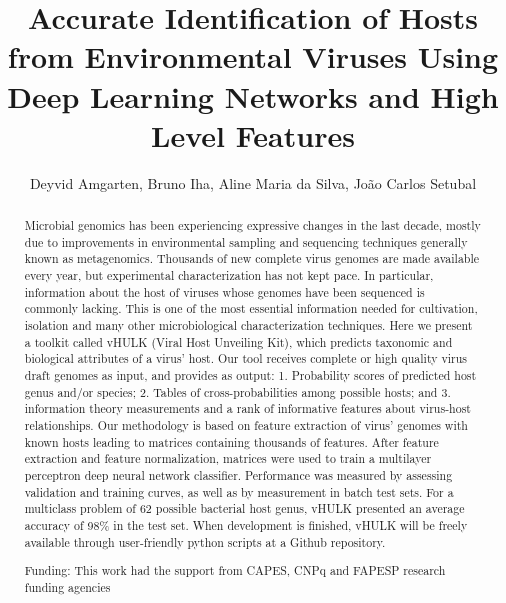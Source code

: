 \documentclass[twoside]{article}
\title{\vspace{-15mm}\fontsize{24pt}{10pt}\selectfont\textbf{ Accurate Identification of Hosts from Environmental Viruses Using Deep Learning Networks and High Level Features }} %
\author{ Deyvid Amgarten, Bruno Iha, Aline Maria da Silva, Jo\~ao Carlos Setubal }
\affil{ Laborat\'orio de T\'ecnicas Especiais,  Hospital Israelita Albert Einstein }
\date{}
\begin{document}
  
  
  \maketitle %
  
  
  \thispagestyle{fancy} %
  
  
  \begin{abstract}
  Microbial genomics has been experiencing expressive changes in the last decade,  mostly due to improvements in environmental sampling and sequencing techniques generally known as metagenomics. Thousands of new complete virus genomes are made available every year,  but experimental characterization has not kept pace. In particular,  information about the host of viruses whose genomes have been sequenced is commonly lacking. This is one of the most essential information needed for cultivation,  isolation and many other microbiological characterization techniques. Here we present a toolkit called vHULK (Viral Host Unveiling Kit),  which predicts taxonomic and biological attributes of a virus’ host. Our tool receives complete or high quality virus draft genomes as input,  and provides as output: 1. Probability scores of predicted host genus and/or species; 2. Tables of cross-probabilities among possible hosts; and 3. information theory measurements and a rank of informative features about virus-host relationships. Our methodology is based on feature extraction of virus’ genomes with known hosts leading to matrices containing thousands of features. After feature extraction and feature normalization,  matrices were used to train a multilayer perceptron deep neural network classifier. Performance was measured by assessing validation and training curves,  as well as by measurement in batch test sets. For a multiclass problem of 62 possible bacterial host genus,  vHULK presented an average accuracy of 98\% in the test set. When development is finished,  vHULK will be freely available through user-friendly python scripts at a Github repository.
  
  Funding: This work had the support from CAPES,  CNPq and FAPESP research funding agencies \\ 
  \end{abstract}
  
\end{document}
